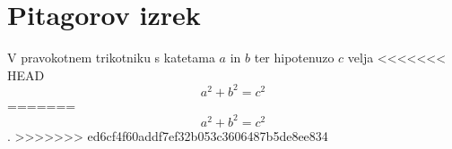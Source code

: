 \documentclass{article}
\begin{document}
\section*{Pitagorov izrek}
V pravokotnem trikotniku s katetama \(a\) in \(b\) ter hipotenuzo \(c\) velja
<<<<<<< HEAD
\[ a^2 + b^2 = c^2 \]
=======
\[ a^2 + b^2 = c^2 \].
>>>>>>> ed6cf4f60addf7ef32b053c3606487b5de8ee834
\end{document}
